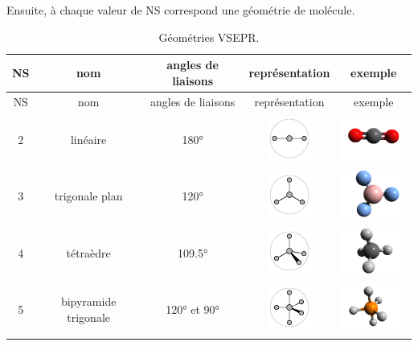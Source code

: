 \documentclass[
  11pt,
  french,
  a4paper,
  openany]{book}
\begin{document}
Ensuite, à chaque valeur de NS correspond une géométrie de molécule.

\newpage

\begin{longtable}[]{@{}ccccc@{}}
\caption{\label{tab:tab-vsepr} Géométries VSEPR.}\tabularnewline
\toprule
NS & nom & angles de liaisons & représentation & exemple\tabularnewline
\midrule
\endfirsthead
\toprule
NS & nom & angles de liaisons & représentation & exemple\tabularnewline
\midrule
\endhead
2 & linéaire & 180° & \includegraphics[width=4em,height=\textheight]{images/vsepr-1.png} & \includegraphics[width=6em,height=\textheight]{images/mol3D/CO2.png}\tabularnewline
3 & trigonale plan & 120° & \includegraphics[width=4em,height=\textheight]{images/vsepr-2.png} & \includegraphics[width=6em,height=\textheight]{images/mol3D/BF3.png}\tabularnewline
4 & tétraèdre & 109.5° & \includegraphics[width=4em,height=\textheight]{images/vsepr-3.png} & \includegraphics[width=6em,height=\textheight]{images/mol3D/CH4.png}\tabularnewline
5 & bipyramide trigonale & 120° et 90° & \includegraphics[width=4em,height=\textheight]{images/vsepr-4.png} & \includegraphics[width=6em,height=\textheight]{images/mol3D/PH5.png}\tabularnewline
\bottomrule
\end{longtable}
\end{document}
